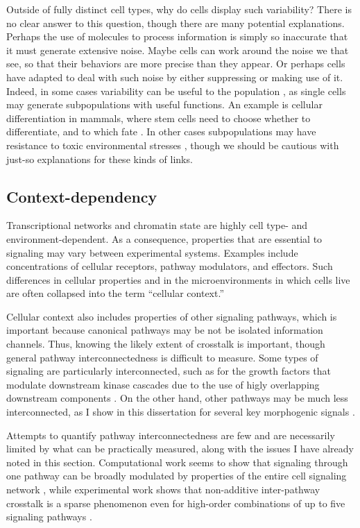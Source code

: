 Outside of fully distinct cell types, why do cells display such variability?
There is no clear answer to this question, though there are many potential
explanations. Perhaps the use of molecules to process information is simply
so inaccurate that it must generate extensive noise. Maybe cells can work
around the noise we that see, so that their behaviors are more precise
than they appear. Or perhaps cells have
adapted to deal with such noise by either suppressing
or making use of it. Indeed, in some cases variability
can be useful to the population \cite{Eldar2010}, as single cells may generate
subpopulations with useful functions. An example is cellular
differentiation in mammals, where stem cells need to choose whether to
differentiate, and to which fate \cite{Chang2008,Kalmar2009,Navarro2012}. In other cases
subpopulations may have resistance to toxic
environmental stresses \cite{Veening2008,Slack2008,Singh2010}, though we
should be cautious with just-so explanations for these kinds of links.


\subsection{Context-dependency}
\label{introduction:encoding:context}

Transcriptional
networks and chromatin state are highly cell type- and
environment-dependent. As a consequence, properties that are essential
to signaling may vary between experimental systems. Examples include
concentrations of cellular receptors, pathway
modulators, and effectors. Such
differences in cellular properties and in the microenvironments
in which cells live are often collapsed into the term ``cellular context.''


Cellular context also includes properties
of other signaling pathways, which is important because
canonical pathways may be not be isolated information channels.
Thus, knowing the likely extent of crosstalk
is important, though general pathway interconnectedness is
difficult to measure. Some types of signaling are particularly interconnected,
such as for the growth factors that modulate
downstream kinase cascades due to the use of higly overlapping downstream components
\cite{Janes2006}. On the other hand, other pathways
may be much less interconnected, as I show in this dissertation
for several key morphogenic signals .


Attempts to quantify pathway interconnectedness are few and are
necessarily limited by what can be practically measured, along with the issues I
have already noted in this section.
Computational work seems to show that signaling through one
pathway can be broadly modulated by properties of the entire
cell signaling network \cite{Domedel-Puig2011}, while experimental
work shows that non-additive inter-pathway crosstalk is a sparse phenomenon
even for high-order combinations
of up to five signaling pathways \cite{Natarajan2006,Hsueh2009}.

